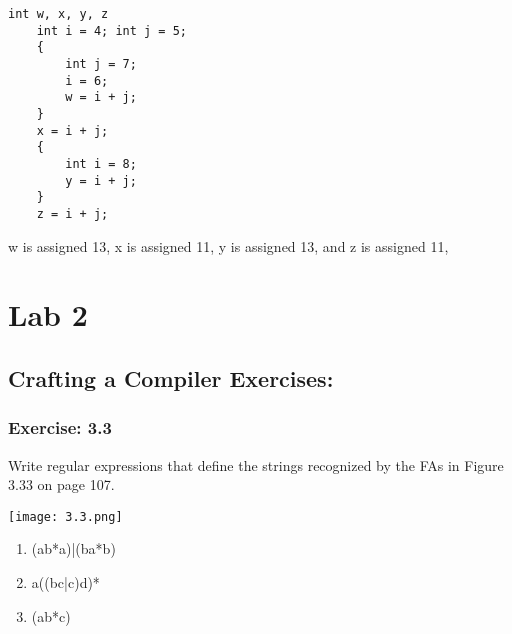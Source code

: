 \documentclass[letterpaper, 10pt,DIV=13]{scrartcl}
\numberwithin{equation}{section} %
\numberwithin{figure}{section} %
\numberwithin{table}{section} %
\begin{document}
    \lstset{numbers=left, numberstyle=\tiny, stepnumber=1, numbersep=5pt, basicstyle=\footnotesize\ttfamily}
    \begin{lstlisting}[frame=single, ]
    int w, x, y, z
    int i = 4; int j = 5;
    { 
        int j = 7;
        i = 6;
        w = i + j;
    }
    x = i + j;
    {
        int i = 8;
        y = i + j;
    }
    z = i + j;
    \end{lstlisting}
    w is assigned 13,
    x is assigned 11,
    y is assigned 13,
    and z is assigned 11,
    


\pagebreak


\section*{Lab 2}

\subsection*{Crafting a Compiler Exercises:}

\subsubsection*{Exercise: 3.3}
Write regular expressions that define the strings recognized by the FAs in Figure 3.33 on page 107.
\newline
\begin{center}
\texttt{[image: 3.3.png]}
\end{center}

\begin{enumerate}
    \item (ab*a)|(ba*b)
    \item a((bc|c)d)*
    \item (ab*c)
\end{enumerate}
    
\end{document}
